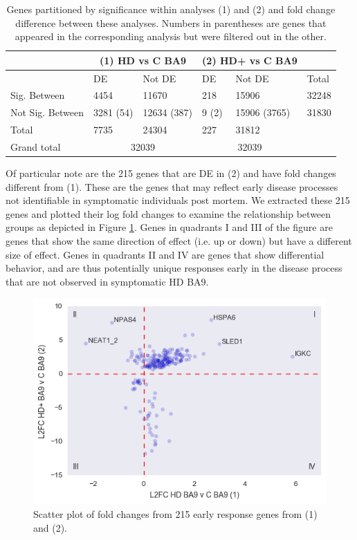 \documentclass[fleqn,10pt,table]{wlscirep}
\begin{document}
\begin{table}[ht]
\centering
{}
\begin{tabular}{|l|l|l|l|l|l|} \hline
                 & \multicolumn{2}{c|}{(1) HD vs C BA9} & \multicolumn{2}{c|}{(2) HD+ vs C BA9} &\\\hline
                 & DE               & Not DE            & DE               & Not DE           & Total \\\hline
Sig. Between     & 4454 & 11670 & 218 & 15906         & 32248 \\\hline
Not Sig. Between & 3281 (54) & 12634 (387) & 9 (2) & 15906 (3765) & 31830 \\\hline
Total            & 7735 & 24304 & 227 & 31812         & \\\hline
Grand total      & \multicolumn{2}{c|}{32039}   & \multicolumn{2}{c|}{32039}               & \\\hline
\end{tabular}
\caption{Genes partitioned by significance within analyses (1) and (2) and fold change difference between these analyses. Numbers in parentheses are genes that appeared in the corresponding analysis but were filtered out in the other. \label{tab:hd+-vs-hd}}
\end{table}

Of particular note are the 215 genes that are DE in (2) and have fold changes different from (1).
These are the genes that may reflect early disease processes not identifiable in symptomatic individuals post mortem.
We extracted these 215 genes and plotted their log fold changes to examine the relationship between groups as depicted in Figure \ref{fig:early_genes}.
Genes in quadrants I and III of the figure are genes that show the same direction of effect (i.e. up or down) but have a different size of effect.
Genes in quadrants II and IV are genes that show differential behavior, and are thus potentially unique responses early in the disease process that are not observed in symptomatic HD BA9.

\begin{figure}[ht]
\centering
\includegraphics[width=0.5\linewidth]{fig5.png}
\caption{Scatter plot of fold changes from 215 early response genes from (1) and (2). \label{fig:early_genes}}
\end{figure}
\end{document}
